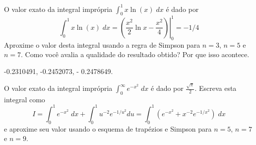 

\begin{exer}
O valor exato da integral imprópria $\int_0^1x\ln(x)\;dx$ é dado por
$$\int_0^1x\ln(x)\;dx=\left.\left(\frac{x^2}{2}\ln x-\frac{x^2}{4}\right)\right|_0^1=-1/4$$
Aproxime o valor desta integral usando a regra  de Simpson para $n=3$, $n=5$ e $n=7$. Como você avalia a qualidade do resultado obtido? Por que isso acontece.
\end{exer}
\begin{resp}

-0.2310491, -0.2452073, - 0.2478649.

\end{resp}

\begin{exer}
O valor exato da integral imprópria $\int_0^\infty e^{-x^2}\;dx$ é dado por $\frac{\sqrt{\pi}}{2}$.
Escreva esta integral como
$$I=\int_0^1 e^{-x^2}\;dx+\int_0^1 u^{-2} e^{-1/u^2}du=\int_0^1 \left(e^{-x^2}+x^{-2}e^{-1/x^2}\right)\;dx$$
e aproxime seu valor usando o esquema de trapézios e Simpson para $n=5$, $n=7$ e $n=9$.
\end{exer}

